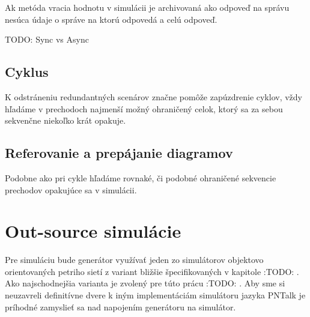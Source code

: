 Ak metóda vracia hodnotu v simulácii je archivovaná ako odpoveď na správu nesúca údaje o správe na ktorú odpovedá a celú odpoveď.

TODO: Sync vs Async

\subsection*{Cyklus}

K odstráneniu redundantných scenárov značne pomôže zapúzdrenie cyklov, vždy hľadáme v prechodoch najmenší možný ohraničený celok, ktorý sa za sebou sekvenčne niekoľko krát opakuje.

\subsection*{Referovanie a prepájanie diagramov}
Podobne ako pri cykle hľadáme rovnaké, či podobné ohraničené sekvencie prechodov opakujúce sa v simulácii.

\section{Out-source simulácie}

Pre simuláciu bude generátor využívať jeden zo simulátorov objektovo orientovaných petriho sietí z variant bližšie špecifikovaných v kapitole :TODO: . Ako najschodnejšia varianta je zvolený pre túto prácu :TODO: . Aby sme si neuzavreli definitívne dvere k iným implementáciám simulátoru jazyka PNTalk je príhodné zamyslieť sa nad napojením generátoru na simulátor. 

